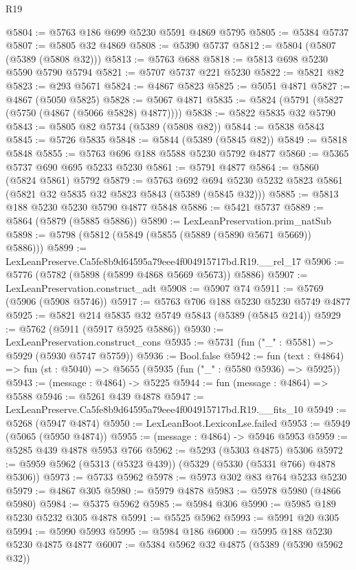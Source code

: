\begin{lexlean}{R19}
\begin{coremodule}
@5804 := @5763 @186 @699 @5230 @5591 @4869 @5795
@5805 := @5384 @5737
@5807 := @5805 @32 @4869
@5808 := @5390 @5737
@5812 := @5804 (@5807 (@5389 (@5808 @32)))
@5813 := @5763 @688
@5818 := @5813 @698 @5230 @5590 @5790 @5794
@5821 := @5707 @5737 @221 @5230
@5822 := @5821 @82
@5823 := @293 @5671
@5824 := @4867 @5823
@5825 := @5051 @4871
@5827 := @4867 (@5050 @5825)
@5828 := @5067 @4871
@5835 := @5824 (@5791 (@5827 (@5750 (@4867 (@5066 @5828) @4877))))
@5838 := @5822 @5835 @32 @5790
@5843 := @5805 @82 @5734 (@5389 (@5808 @82))
@5844 := @5838 @5843
@5845 := @5726 @5835
@5848 := @5844 (@5389 (@5845 @82))
@5849 := @5818 @5848
@5855 := @5763 @696 @188 @5588 @5230 @5792 @4877
@5860 := @5365 @5737 @690 @695 @5233 @5230
@5861 := @5791 @4877
@5864 := @5860 (@5824 @5861) @5792
@5879 := @5763
    @692
    @694
    @5230
    @5232
    @5823
    @5861
    (@5821 @32 @5835 @32 @5823 @5843 (@5389 (@5845 @32)))
@5885 := @5813 @188 @5230 @5230 @5790 @4877 @5848
@5886 := @5421 @5737
@5889 := @5864 (@5879 (@5885 @5886))
@5890 := LexLeanPreservation.prim_natSub
@5898 := @5798 (@5812 (@5849 (@5855 (@5889 (@5890 @5671 @5669)) @5886)))
@5899 := LexLeanPreserve.Ca5fe8b9d64595a79eee4f004915717bd.R19.__rel_17
@5906 := @5776 (@5782 (@5898 (@5899 @4868 @5669 @5673)) @5886)
@5907 := LexLeanPreservation.construct_adt
@5908 := @5907 @74
@5911 := @5769 (@5906 (@5908 @5746))
@5917 := @5763 @706 @188 @5230 @5230 @5749 @4877
@5925 := @5821 @214 @5835 @32 @5749 @5843 (@5389 (@5845 @214))
@5929 := @5762 (@5911 (@5917 @5925 @5886))
@5930 := LexLeanPreservation.construct_cons
@5935 := @5731 (fun ("_" : @5581) => @5929 (@5930 @5747 @5759))
@5936 := Bool.false
@5942 := fun (text : @4864) => fun (st : @5040) => @5655 (@5935 (fun ("_" : @5580 @5936) => @5925))
@5943 := (message : @4864) -> @5225
@5944 := fun (message : @4864) => @5588
@5946 := @5261 @439 @4878
@5947 := LexLeanPreserve.Ca5fe8b9d64595a79eee4f004915717bd.R19.__fits_10
@5949 := @5268 (@5947 @4874)
@5950 := LexLeanBoot.LexiconLse.failed
@5953 := @5949 (@5065 (@5950 @4874))
@5955 := (message : @4864) -> @5946 @5953
@5959 := @5285 @439 @4878 @5953 @766
@5962 := @5293 (@5303 @4875) @5306
@5972 := @5959 @5962 (@5313 (@5323 @439)) (@5329 (@5330 (@5331 @766) @4878 @5306))
@5973 := @5733 @5962
@5978 := @5973 @302 @83 @764 @5233 @5230
@5979 := @4867 @305
@5980 := @5979 @4878
@5983 := @5978 @5980 (@4866 @5980)
@5984 := @5375 @5962
@5985 := @5984 @306
@5990 := @5985 @189 @5230 @5232 @305 @4878
@5991 := @5525 @5962
@5993 := @5991 @20 @305
@5994 := @5990 @5993
@5995 := @5984 @186
@6000 := @5995 @188 @5230 @5230 @4875 @4877
@6007 := @5384 @5962 @32 @4875 (@5389 (@5390 @5962 @32))

\end{coremodule}
\end{lexlean}
